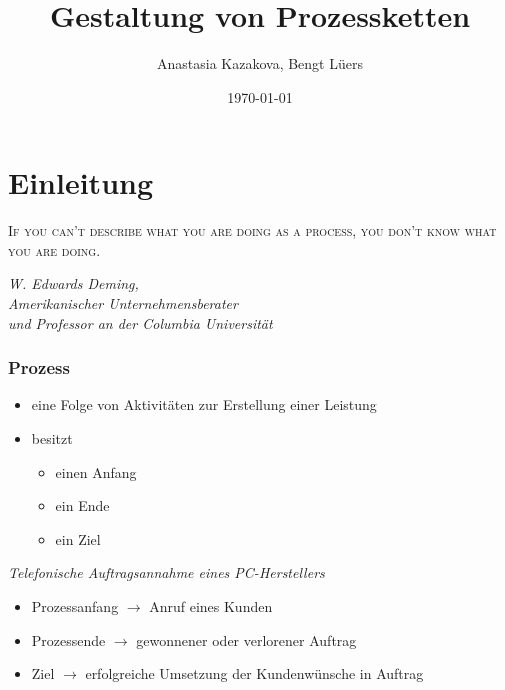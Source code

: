 \documentclass{beamer}
\title{Gestaltung von Prozessketten}
\author[A. Kazakova \\B. Lüers]{Anastasia Kazakova, Bengt Lüers}
\institute[Universität Oldenburg]{
  \inst{}Fakultät 2 - Informatik, Wirtschafts- und Rechtswissenschaften}
\date{\today}
\begin{document}
 \frame{\titlepage}


 \section[Einleitung]{Einleitung}

 \begin{frame}


 \textsc{\flqq If you can't describe what you are doing as a process, you don't know what you are doing.\frqq}
 \\
 \medskip
 \begin{flushright}
   \begin{small}
    \emph{\textit{W. Edwards Deming, \\
        Amerikanischer Unternehmensberater \\
        und Professor an der Columbia Universität}}
  \end{small}
 \end{flushright}

 \end{frame}

 \begin{frame}
  \frametitle{Prozess}
  
  \begin{itemize}
  \item eine Folge von Aktivitäten zur Erstellung einer Leistung
  \item besitzt
  	\begin{itemize}
  		\item einen Anfang
  		\item ein Ende
  		\item ein Ziel
  	\end{itemize}
  \end{itemize}
\bigskip


\pause
\emph{Telefonische Auftragsannahme eines PC-Herstellers} \pause
\begin{itemize} 
	\item Prozessanfang $\rightarrow$ Anruf eines Kunden \pause
	\item Prozessende $\rightarrow$ gewonnener oder verlorener Auftrag \pause
	\item Ziel $\rightarrow$ erfolgreiche Umsetzung der Kundenwünsche in Auftrag 
\end{itemize}







\end{frame}
\end{document}

